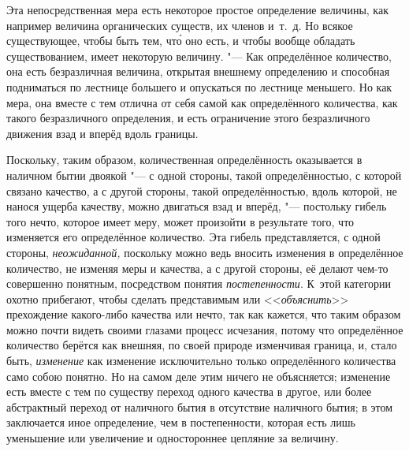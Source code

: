 Эта непосредственная мера есть некоторое простое определение величины, как
например величина органических существ, их членов и~т.~д. Но всякое
существующее, чтобы быть тем, чт\'{о} оно есть, и чтобы вообще обладать
существованием, имеет некоторую величину. "--- Как определённое количество, она
есть безразличная величина, открытая внешнему определению и способная
подниматься по лестнице большего и опускаться по лестнице меньшего. Но как
мера, она вместе с тем отлична от себя самой как определённого количества, как
такого безразличного определения, и есть ограничение этого безразличного
движения взад и вперёд вдоль границы.

Поскольку, таким образом, количественная определённость оказывается в наличном
бытии двоякой "--- с одной стороны, такой определённостью, с которой связано
качество, а с другой стороны, такой определённостью, вдоль которой, не нанося
ущерба качеству, можно двигаться взад и вперёд, "--- постольку гибель того
нечто, которое имеет меру, может произойти в результате того, что изменяется
его определённое количество. Эта гибель представляется, с одной стороны,
{\em неожиданной,} поскольку можно ведь вносить изменения в определённое
количество, не изменяя меры и качества, а с другой стороны, её делают чем-то
совершенно понятным, посредством понятия {\em постепенности}. К~этой категории
охотно прибегают, чтобы сделать представимым или <<{\em объяснить}>>
прехождение какого-либо качества или нечто, так как кажется, что таким образом
можно почти видеть своими глазами процесс исчезания, потому что определённое
количество берётся как внешняя, по своей природе изменчивая граница, и, стало
быть, {\em изменение} как изменение исключительно только определённого
количества само собою понятно. Но на самом деле этим ничего не объясняется;
изменение есть вместе с тем по существу переход одного качества в другое, или
более абстрактный переход от наличного бытия в отсутствие наличного бытия; в
этом заключается иное определение, чем в постепенности, которая есть лишь
уменьшение или увеличение и одностороннее цепляние за величину.

